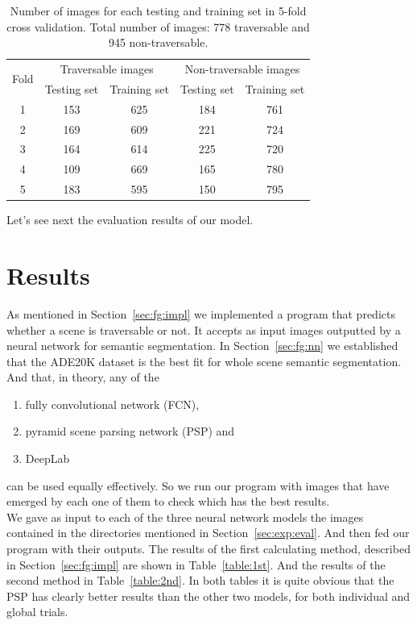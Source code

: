 \documentclass[12pt,a4paper,table,dvipsnames,tikz]{report}
\newcommand{\acronym}{\MakeUppercase}
\newcommand{\bl}[1]{{\hypersetup{linkcolor=blue}#1}}
\begin{document}
	\begin{table}[h!]
		\centering
		\begin{tabular}{|c|c|c|c|c|}
			\hline
			\multirow{2}{*}{Fold} & \multicolumn{2}{c|}{Traversable images} & 
			\multicolumn{2}{c|}{Non-traversable images}\\
			& Testing set & Training set & Testing set & Training set\\
			\hline\hline
			1 & 153 & 625 & 184 & 761\\
			\hline
			2 & 169 & 609 & 221 & 724\\
			\hline
			3 & 164 & 614 & 225 & 720\\
			\hline
			4 & 109 & 669 & 165 & 780\\
			\hline
			5 & 183 & 595 & 150 & 795\\
			\hline
		\end{tabular}
		\caption{Number of images for each testing and training set in 5-fold cross validation. 
			Total number of images: 778 traversable and 945 non-traversable.}
		\label{table:folds_images}
	\end{table}
	
	Let's see next the evaluation results of our model. 
	\\
	
	
	\section{Results}
	\label{sec:exp:res}
	
	As mentioned in Section~\ref{sec:fg:impl} we implemented a program that predicts whether 
	a scene is traversable or not. It accepts as input images outputted by a neural network 
	for semantic segmentation. In Section~\ref{sec:fg:nn} we established that the 
	\acronym{ade20k} dataset is the best fit for whole scene semantic segmentation. And that, 
	in theory, any of the
	\begin{enumerate}
		\item fully convolutional network (\acronym{fcn}), 
		\item pyramid scene parsing network (\acronym{psp}) and 
		\item DeepLab 
	\end{enumerate}
	can be used equally effectively. So we run our program with images that have emerged by 
	each one of them to check which has the best results.
	\\
	
	We gave as input to each of the three neural network models the images contained in the 
	directories mentioned in Section~\ref{sec:exp:eval}. And then fed our program with their 
	outputs. The results of the first calculating method, described in Section~\ref{sec:fg:impl} 
	are shown in Table~\bl{\ref{table:1st}}. And the results of the second method in 
	Table~\bl{\ref{table:2nd}}. In both tables it is quite obvious that the PSP has clearly 
	better results than the other two models, for both individual and global trials.
	\\
	
\end{document}
